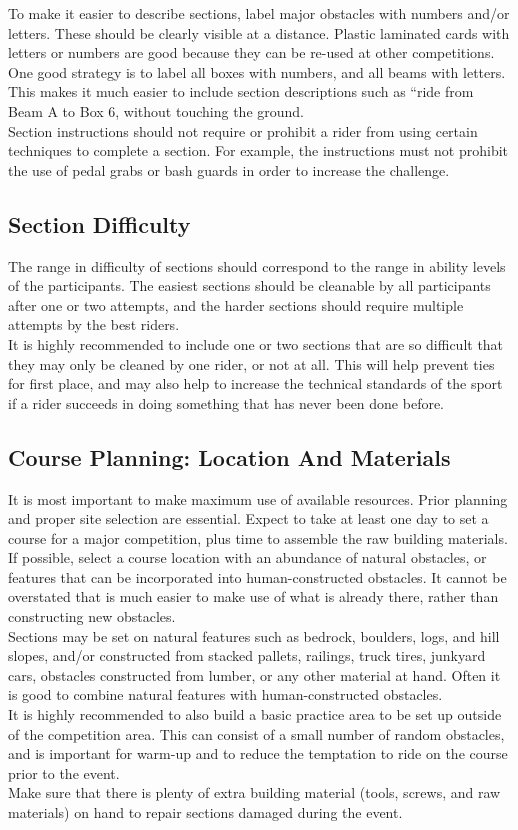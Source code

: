 	
To make it easier to describe sections, label major obstacles with numbers and/or letters. These should be clearly visible at a distance. Plastic laminated cards with letters or numbers are good because they can be re-used at other competitions.\\
One good strategy is to label all boxes with numbers, and all beams with letters. This makes it much easier to include
section descriptions such as “ride from Beam A to Box 6, without touching the ground.\\
Section instructions should not require or prohibit a rider from using certain techniques to complete a section. For example, the instructions must not prohibit the use of pedal grabs or bash guards in order to increase the challenge.

\subsection{Section Difficulty}
The range in difficulty of sections should correspond to the range in ability levels of the participants. The easiest
sections should be cleanable by all participants after one or two attempts, and the harder sections should require
multiple attempts by the best riders.\\
It is highly recommended to include one or two sections that are so difficult that they may only be cleaned by one rider,
or not at all. This will help prevent ties for first place, and may also help to increase the technical standards of the sport
if a rider succeeds in doing something that has never been done before.

\subsection{Course Planning: Location And Materials}
It is most important to make maximum use of available resources. Prior planning and proper site selection are essential.
Expect to take at least one day to set a course for a major competition, plus time to assemble the raw building
materials.\\
If possible, select a course location with an abundance of natural obstacles, or features that can be incorporated into
human-constructed obstacles. It cannot be overstated that is much easier to make use of what is already there, rather
than constructing new obstacles.\\
Sections may be set on natural features such as bedrock, boulders, logs, and hill slopes, and/or constructed from
stacked pallets, railings, truck tires, junkyard cars, obstacles constructed from lumber, or any other material at hand.
Often it is good to combine natural features with human-constructed obstacles.\\
It is highly recommended to also build a basic practice area to be set up outside of the competition area. This can
consist of a small number of random obstacles, and is important for warm-up and to reduce the temptation to ride on
the course prior to the event.\\
Make sure that there is plenty of extra building material (tools, screws, and raw materials) on hand to repair sections
damaged during the event.

